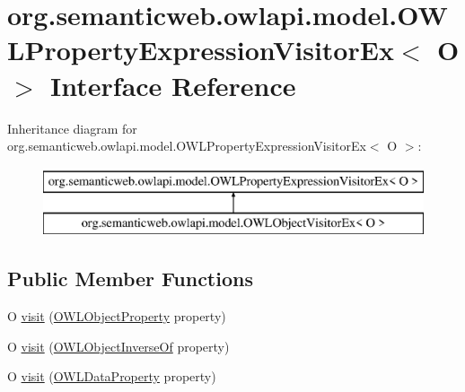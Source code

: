 \hypertarget{interfaceorg_1_1semanticweb_1_1owlapi_1_1model_1_1_o_w_l_property_expression_visitor_ex_3_01_o_01_4}{\section{org.\-semanticweb.\-owlapi.\-model.\-O\-W\-L\-Property\-Expression\-Visitor\-Ex$<$ O $>$ Interface Reference}
\label{interfaceorg_1_1semanticweb_1_1owlapi_1_1model_1_1_o_w_l_property_expression_visitor_ex_3_01_o_01_4}
}
Inheritance diagram for org.\-semanticweb.\-owlapi.\-model.\-O\-W\-L\-Property\-Expression\-Visitor\-Ex$<$ O $>$\-:\begin{figure}[H]
\begin{center}
\leavevmode
\includegraphics[height=2.000000cm]{interfaceorg_1_1semanticweb_1_1owlapi_1_1model_1_1_o_w_l_property_expression_visitor_ex_3_01_o_01_4}
\end{center}
\end{figure}
\subsection*{Public Member Functions}
\begin{DoxyCompactItemize}
\item 
O \hyperlink{interfaceorg_1_1semanticweb_1_1owlapi_1_1model_1_1_o_w_l_property_expression_visitor_ex_3_01_o_01_4_ae2c374f8794c019ead6de2882b39d2f6}{visit} (\hyperlink{interfaceorg_1_1semanticweb_1_1owlapi_1_1model_1_1_o_w_l_object_property}{O\-W\-L\-Object\-Property} property)
\item 
O \hyperlink{interfaceorg_1_1semanticweb_1_1owlapi_1_1model_1_1_o_w_l_property_expression_visitor_ex_3_01_o_01_4_a10701aa5042862e4793dbbdd06f4249b}{visit} (\hyperlink{interfaceorg_1_1semanticweb_1_1owlapi_1_1model_1_1_o_w_l_object_inverse_of}{O\-W\-L\-Object\-Inverse\-Of} property)
\item 
O \hyperlink{interfaceorg_1_1semanticweb_1_1owlapi_1_1model_1_1_o_w_l_property_expression_visitor_ex_3_01_o_01_4_aca79072ed1652698781e46efdfb8dce6}{visit} (\hyperlink{interfaceorg_1_1semanticweb_1_1owlapi_1_1model_1_1_o_w_l_data_property}{O\-W\-L\-Data\-Property} property)
\end{DoxyCompactItemize}


